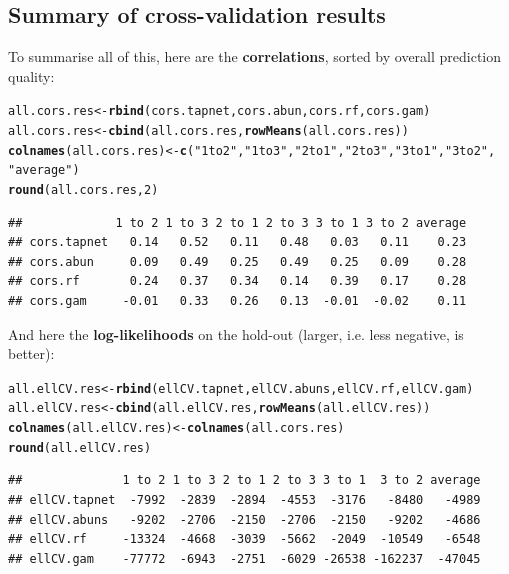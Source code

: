 \documentclass[a4paper, 11pt]{article}\usepackage[]{graphicx}\usepackage[]{color}
\makeatletter
\newcommand{\hlnum}[1]{\textcolor[rgb]{0.686,0.059,0.569}{#1}}%
\newcommand{\hlstr}[1]{\textcolor[rgb]{0.192,0.494,0.8}{#1}}%
\newcommand{\hlstd}[1]{\textcolor[rgb]{0.345,0.345,0.345}{#1}}%
\newcommand{\hlkwb}[1]{\textcolor[rgb]{0.69,0.353,0.396}{#1}}%
\newcommand{\hlkwd}[1]{\textcolor[rgb]{0.737,0.353,0.396}{\textbf{#1}}}%
\newenvironment{kframe}{%
 \def\at@end@of@kframe{}%
 \ifinner\ifhmode%
  \def\at@end@of@kframe{\end{minipage}}%
  \begin{minipage}{\columnwidth}%
 \fi\fi%
 \def\FrameCommand##1{\hskip\@totalleftmargin \hskip-\fboxsep
 \colorbox{shadecolor}{##1}\hskip-\fboxsep
     \hskip-\linewidth \hskip-\@totalleftmargin \hskip\columnwidth}%
 \MakeFramed {\advance\hsize-\width
   \@totalleftmargin\z@ \linewidth\hsize
   \@setminipage}}%
 {\par\unskip\endMakeFramed%
 \at@end@of@kframe}
\newenvironment{knitrout}{}{} %
\makeatother
\begin{document}
\subsection{Summary of cross-validation results}
To summarise all of this, here are the \textbf{correlations}, sorted by overall prediction quality:
\begin{knitrout}\small
{}\color{fgcolor}\begin{kframe}
\begin{alltt}
\hlstd{all.cors.res} \hlkwb{<-} \hlkwd{rbind}\hlstd{(cors.tapnet, cors.abun, cors.rf, cors.gam)}
\hlstd{all.cors.res} \hlkwb{<-} \hlkwd{cbind}\hlstd{(all.cors.res,} \hlkwd{rowMeans}\hlstd{(all.cors.res))}
\hlkwd{colnames}\hlstd{(all.cors.res)} \hlkwb{<-} \hlkwd{c}\hlstd{(}\hlstr{"1 to 2"}\hlstd{,} \hlstr{"1 to 3"}\hlstd{,} \hlstr{"2 to 1"}\hlstd{,} \hlstr{"2 to 3"}\hlstd{,} \hlstr{"3 to 1"}\hlstd{,} \hlstr{"3 to 2"}\hlstd{,}
                            \hlstr{"average"}\hlstd{)}
\hlkwd{round}\hlstd{(all.cors.res,} \hlnum{2}\hlstd{)}
\end{alltt}
\begin{verbatim}
##             1 to 2 1 to 3 2 to 1 2 to 3 3 to 1 3 to 2 average
## cors.tapnet   0.14   0.52   0.11   0.48   0.03   0.11    0.23
## cors.abun     0.09   0.49   0.25   0.49   0.25   0.09    0.28
## cors.rf       0.24   0.37   0.34   0.14   0.39   0.17    0.28
## cors.gam     -0.01   0.33   0.26   0.13  -0.01  -0.02    0.11
\end{verbatim}
\end{kframe}
\end{knitrout}
And here the \textbf{log-likelihoods} on the hold-out (larger, i.e. less negative, is better):
\begin{knitrout}\small
{}\color{fgcolor}\begin{kframe}
\begin{alltt}
\hlstd{all.ellCV.res} \hlkwb{<-} \hlkwd{rbind}\hlstd{(ellCV.tapnet, ellCV.abuns, ellCV.rf, ellCV.gam)}
\hlstd{all.ellCV.res} \hlkwb{<-} \hlkwd{cbind}\hlstd{(all.ellCV.res,} \hlkwd{rowMeans}\hlstd{(all.ellCV.res))}
\hlkwd{colnames}\hlstd{(all.ellCV.res)} \hlkwb{<-} \hlkwd{colnames}\hlstd{(all.cors.res)}
\hlkwd{round}\hlstd{(all.ellCV.res)}
\end{alltt}
\begin{verbatim}
##              1 to 2 1 to 3 2 to 1 2 to 3 3 to 1  3 to 2 average
## ellCV.tapnet  -7992  -2839  -2894  -4553  -3176   -8480   -4989
## ellCV.abuns   -9202  -2706  -2150  -2706  -2150   -9202   -4686
## ellCV.rf     -13324  -4668  -3039  -5662  -2049  -10549   -6548
## ellCV.gam    -77772  -6943  -2751  -6029 -26538 -162237  -47045
\end{verbatim}
\end{kframe}
\end{knitrout}
\end{document}
